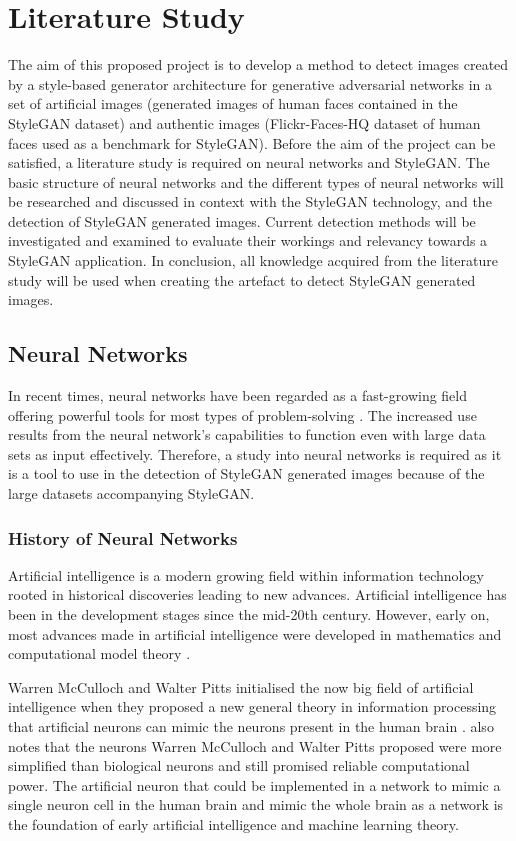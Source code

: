 \chapter{Literature Study}\label{ch2}

The aim of this proposed project is to develop a method to detect images created by a style-based generator architecture for generative adversarial networks in a set of artificial images (generated images of human faces contained in the StyleGAN dataset) and authentic images (Flickr-Faces-HQ dataset of human faces used as a benchmark for StyleGAN). Before the aim of the project can be satisfied, a literature study is required on neural networks and StyleGAN. The basic structure of neural networks and the different types of neural networks will be researched and discussed in context with the StyleGAN technology, and the detection of StyleGAN generated images. Current detection methods will be investigated and examined to evaluate their workings and relevancy towards a StyleGAN application. In conclusion, all knowledge acquired from the literature study will be used when creating the artefact to detect StyleGAN generated images.

\section{Neural Networks}

In recent times, neural networks have been regarded as a fast-growing field offering powerful tools for most types of problem-solving \citep{Albawi}. The increased use results from the neural network's capabilities to function even with large data sets as input effectively. Therefore, a study into neural networks is required as it is a tool to use in the detection of StyleGAN generated images because of the large datasets accompanying StyleGAN. 

\subsection{History of Neural Networks}

Artificial intelligence is a modern growing field within information technology rooted in historical discoveries leading to new advances. Artificial intelligence has been in the development stages since the mid-20th century. However, early on, most advances made in artificial intelligence were developed in mathematics and computational model theory \citep{Mueller1995}.

Warren McCulloch and Walter Pitts initialised the now big field of artificial intelligence when they proposed a new general theory in information processing that artificial neurons can mimic the neurons present in the human brain \citep{Mueller1995}. \cite{Mueller1995} also notes that the neurons Warren McCulloch and Walter Pitts proposed were more simplified than biological neurons and still promised reliable computational power. The artificial neuron that could be implemented in a network to mimic a single neuron cell in the human brain and mimic the whole brain as a network is the foundation of early artificial intelligence and machine learning theory.

